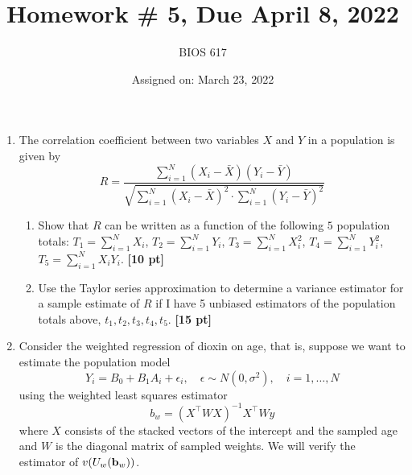\documentclass[12pt]{article}
\begin{document}
\title{Homework \# 5, Due April 8, 2022}
\author{BIOS 617}
\date{Assigned on: March 23, 2022}

\maketitle

\begin{enumerate}
\setlength{\itemsep}{15pt}%
\setlength{\parskip}{15pt}%

\item  The correlation coefficient between two variables $X$ and $Y$ in a population is given by
$$
R = \frac{ \sum_{i=1}^N (X_i - \bar X) (Y_i - \bar Y) }{ \sqrt{\sum_{i=1}^N (X_i - \bar X)^2 \cdot \sum_{i=1}^N (Y_i - \bar Y)^2 }}
$$
	\begin{enumerate}[itemsep=5ex]
	\item Show that $R$ can be written as a function of the following $5$ population totals: $T_1 = \sum_{i=1}^N X_i$, $T_2 = \sum_{i=1}^N Y_i$, $T_3 = \sum_{i=1}^N X_i^2$, $T_4 = \sum_{i=1}^N Y_i^2$, $T_5 = \sum_{i=1}^N X_i Y_i$. {\bf [10 pt]}
	\item Use the Taylor series approximation to determine a variance estimator for a sample estimate of $R$ if I have 5 unbiased estimators of the population totals above, $t_1,t_2,t_3,t_4,t_5$. {\bf [15 pt]}
	\end{enumerate}
\item Consider the weighted regression of dioxin on age, that is, suppose we want to estimate the population model
$$
Y_i = B_0 + B_1 A_i + \epsilon_i, \quad \epsilon \sim N(0,\sigma^2), \quad i=1,\ldots, N
$$
using the weighted least squares estimator
$$
b_w = \left( X^\top W X \right)^{-1} X^\top W y
$$
where $X$ consists of the stacked vectors of the intercept and the sampled age and $W$ is the diagonal matrix of sampled weights. We will verify the estimator of $v(U_w ({\bf b}_w))$.


\end{enumerate}
\end{document}
